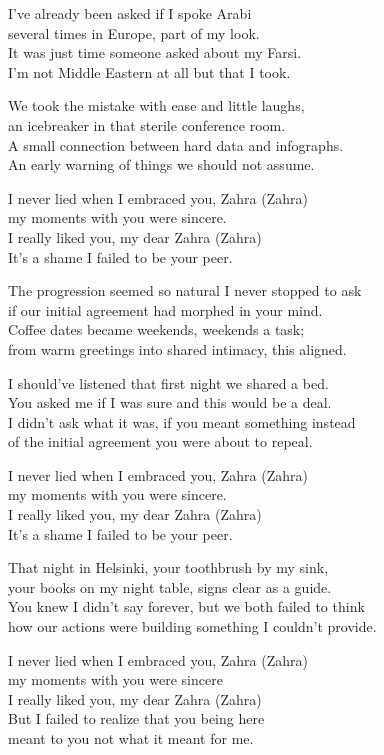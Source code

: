 \begin{lyrics}
I’ve already been asked if I spoke Arabi\\
several times in Europe, part of my look.\\
It was just time someone asked about my Farsi.\\
I’m not Middle Eastern at all but that I took.

We took the mistake with ease and little laughs,\\
an icebreaker in that sterile conference room.\\
A small connection between hard data and infographs.\\
An early warning of things we should not assume.

I never lied when I embraced you, Zahra (Zahra)\\
my moments with you were sincere.\\
I really liked you, my dear Zahra (Zahra)\\
It’s a shame I failed to be your peer.

The progression seemed so natural I never stopped to ask\\
if our initial agreement had morphed in your mind.\\
Coffee dates became weekends, weekends a task;\\
from warm greetings into shared intimacy, this aligned.

I should’ve listened that first night we shared a bed.\\
You asked me if I was sure and this would be a deal.\\
I didn’t ask what it was, if you meant something instead\\
of the initial agreement you were about to repeal.

I never lied when I embraced you, Zahra (Zahra)\\
my moments with you were sincere.\\
I really liked you, my dear Zahra (Zahra)\\
It’s a shame I failed to be your peer.

That night in Helsinki, your toothbrush by my sink,\\
your books on my night table, signs clear as a guide.\\
You knew I didn’t say forever, but we both failed to think\\
how our actions were building something I couldn’t provide.

I never lied when I embraced you, Zahra (Zahra)\\
my moments with you were sincere\\
I really liked you, my dear Zahra (Zahra)\\
But I failed to realize that you being here\\
meant to you not what it meant for me.
\end{lyrics}


